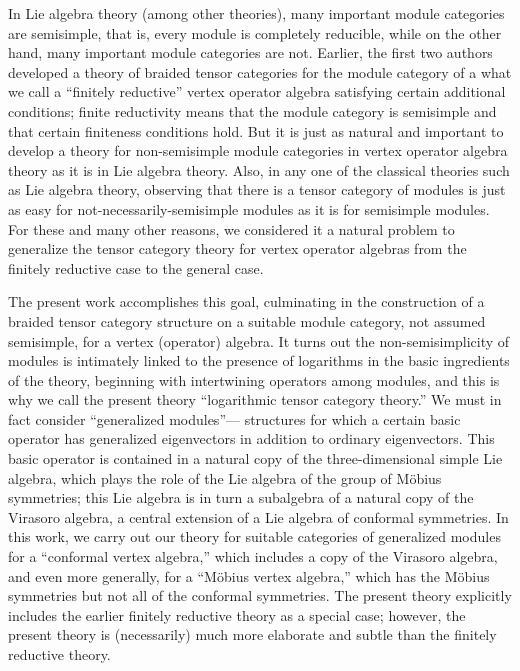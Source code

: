 \documentclass[12pt]{article}
\begin{document}
In Lie algebra theory (among other theories), many important module
categories are semisimple, that is, every module is completely
reducible, while on the other hand, many important module categories
are not.  Earlier, the first two authors developed a theory of braided
tensor categories for the module category of a what we call a
``finitely reductive'' vertex operator algebra satisfying certain
additional conditions; finite reductivity means that the module
category is semisimple and that certain finiteness conditions hold.
But it is just as natural and important to develop a theory for
non-semisimple module categories in vertex operator algebra theory as
it is in Lie algebra theory.  Also, in any one of the classical
theories such as Lie algebra theory, observing that there is a tensor
category of modules is just as easy for not-necessarily-semisimple
modules as it is for semisimple modules.  For these and many other
reasons, we considered it a natural problem to generalize the tensor
category theory for vertex operator algebras from the finitely
reductive case to the general case.

The present work accomplishes this goal, culminating in the
construction of a braided tensor category structure on a suitable
module category, not assumed semisimple, for a vertex (operator)
algebra.  It turns out the non-semisimplicity of modules is intimately
linked to the presence of logarithms in the basic ingredients of the
theory, beginning with intertwining operators among modules, and this
is why we call the present theory ``logarithmic tensor category
theory.''  We must in fact consider ``generalized modules''---
structures for which a certain basic operator has generalized
eigenvectors in addition to ordinary eigenvectors.  This basic
operator is contained in a natural copy of the three-dimensional
simple Lie algebra, which plays the role of the Lie algebra of the
group of M\"obius symmetries; this Lie algebra is in turn a subalgebra
of a natural copy of the Virasoro algebra, a central extension of a
Lie algebra of conformal symmetries.  In this work, we carry out our
theory for suitable categories of generalized modules for a
``conformal vertex algebra,'' which includes a copy of the Virasoro
algebra, and even more generally, for a ``M\"obius vertex algebra,''
which has the M\"obius symmetries but not all of the conformal
symmetries.  The present theory explicitly includes the earlier
finitely reductive theory as a special case; however, the present
theory is (necessarily) much more elaborate and subtle than the
finitely reductive theory.
\end{document}
